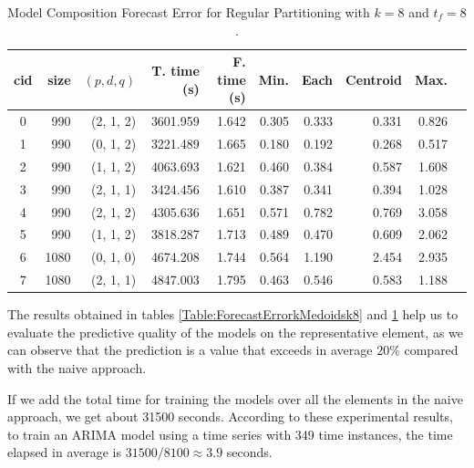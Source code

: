 \begin{table}[h]
	\centering
	\small
	\begin{tabular}{|c|r|r|r|r|r|r|r|r|r|}
		\hline
        cid & size & $(p, d, q)$ & T. time (s) & F. time (s) & Min. & Each & \cellcolor{red!20}Centroid & Max. \\
        \hline
        0 &  990 & (2, 1, 2) &  3601.959 & 1.642 & 0.305 & 0.333 & \cellcolor{red!20}0.331 & 0.826 \\
        1 &  990 & (0, 1, 2) &  3221.489 & 1.665 & 0.180 & 0.192 & \cellcolor{red!20}0.268 & 0.517 \\
        2 &  990 & (1, 1, 2) &  4063.693 & 1.621 & 0.460 & 0.384 & \cellcolor{red!20}0.587 & 1.608 \\
        3 &  990 & (2, 1, 1) &  3424.456 & 1.610 & 0.387 & 0.341 & \cellcolor{red!20}0.394 & 1.028 \\
        4 &  990 & (2, 1, 2) &  4305.636 & 1.651 & 0.571 & 0.782 & \cellcolor{red!20}0.769 & 3.058 \\
        5 &  990 & (1, 1, 2) &  3818.287 & 1.713 & 0.489 & 0.470 & \cellcolor{red!20}0.609 & 2.062 \\
        6 & 1080 & (0, 1, 0) &  4674.208 & 1.744 & 0.564 & 1.190 & \cellcolor{red!20}2.454 & 2.935 \\
        7 & 1080 & (2, 1, 1) &  4847.003 & 1.795 & 0.463 & 0.546 & \cellcolor{red!20}0.583 & 1.188 \\ \hline
	\end{tabular}
	\caption{Model Composition Forecast Error for Regular Partitioning with $k=8$ and $t_{f} =8$.}
	\label{Table:ForecastErrorRegulark10}
\end{table}

The results obtained in tables \ref{Table:ForecastErrorkMedoidsk8} and \ref{Table:ForecastErrorRegulark10} help us to evaluate the predictive quality of the models on the representative element, as we can observe that the prediction is a value that exceeds in average $20\%$ compared with the naive approach. 


If we add the total time for training the models over all the elements in the naive approach, we get about 31500 seconds. According to these experimental results, to train an ARIMA model using a time series with 349 time instances, the time elapsed in average is $31500 / 8100 \approx 3.9$ seconds. 

